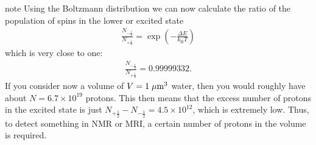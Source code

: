 \documentclass[letterpaper,10pt,english]{sphinxmanual}
\begin{document}
\begin{sphinxadmonition}{note}{}
\sphinxAtStartPar
Using the Boltzmann distribution we can now calculate the ratio of the population of spins in the lower or excited state
\begin{equation*}
\begin{split}\frac{N_{-\frac{1}{2}}}{N_{+\frac{1}{2}}}=\exp\left (-\frac{\Delta E}{k_\mathrm{B} T} \right )\end{split}
\end{equation*}
\sphinxAtStartPar
which is very close to one:
\begin{equation*}
\begin{split}\frac{N_{-\frac{1}{2}}}{N_{+\frac{1}{2}}}=0.99999332.\end{split}
\end{equation*}
\sphinxAtStartPar
If you consider now a volume of \(V=1\;{\rm {\mu m}}^3\) water, then you would roughly have about \(N=6.7\times 10^{19}\) protons. This then means that the excess number of protons in the excited state is just \(N_{+\frac{1}{2}}-N_{-\frac{1}{2}}=4.5\times 10^{12}\), which is extremely low. Thus, to detect something in NMR or MRI, a certain number of protons in the volume is required.
\end{sphinxadmonition}
\end{document}
